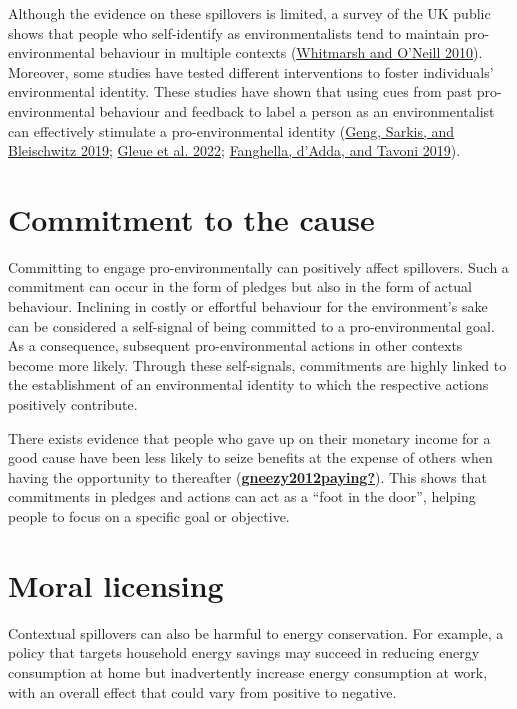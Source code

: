\documentclass[
  11pt,
  captions=heading]{scrreport}
\begin{document}
Although the evidence on these spillovers is limited, a survey of the UK
public shows that people who self-identify as environmentalists tend to
maintain pro-environmental behaviour in multiple contexts
(\protect\hyperlink{ref-whitmarsh2010green}{Whitmarsh and O'Neill
2010}). Moreover, some studies have tested different interventions to
foster individuals' environmental identity. These studies have shown
that using cues from past pro-environmental behaviour and feedback to
label a person as an environmentalist can effectively stimulate a
pro-environmental identity
(\protect\hyperlink{ref-geng2019globalize}{Geng, Sarkis, and Bleischwitz
2019}; \protect\hyperlink{ref-gleue2022identity}{Gleue et al. 2022};
\protect\hyperlink{ref-fanghella2019use}{Fanghella, d'Adda, and Tavoni
2019}).

\hypertarget{commitment-to-the-cause}{%
\section{Commitment to the cause}\label{commitment-to-the-cause}}

Committing to engage pro-environmentally can positively affect
spillovers. Such a commitment can occur in the form of pledges but also
in the form of actual behaviour. Inclining in costly or effortful
behaviour for the environment's sake can be considered a self-signal of
being committed to a pro-environmental goal. As a consequence,
subsequent pro-environmental actions in other contexts become more
likely. Through these self-signals, commitments are highly linked to the
establishment of an environmental identity to which the respective
actions positively contribute.

There exists evidence that people who gave up on their monetary income
for a good cause have been less likely to seize benefits at the expense
of others when having the opportunity to thereafter
(\protect\hyperlink{ref-gneezy2012paying}{\textbf{gneezy2012paying?}}).
This shows that commitments in pledges and actions can act as a ``foot
in the door'', helping people to focus on a specific goal or objective.

\hypertarget{moral-licensing}{%
\section{Moral licensing}\label{moral-licensing}}

Contextual spillovers can also be harmful to energy conservation. For
example, a policy that targets household energy savings may succeed in
reducing energy consumption at home but inadvertently increase energy
consumption at work, with an overall effect that could vary from
positive to negative.
\end{document}
